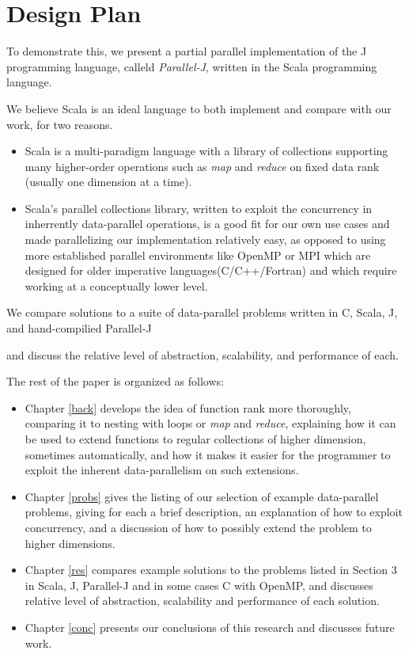 \section{Design Plan}
To demonstrate this, we present a partial parallel implementation of the J programming language, calleld \textit{Parallel-J}, written in the Scala programming language.\begin{comment}TODO cite?\end{comment}
We believe Scala is an ideal language to both implement and compare with our work, for two reasons.
\begin{itemize}
    \item Scala is a multi-paradigm language with a library of collections supporting many higher-order operations such as \textit{map} and \textit{reduce} on fixed data rank (usually one dimension at a time). %
    \item Scala's parallel collections library\cite{pc}, written to exploit the concurrency in inherrently data-parallel operations, is a good fit for our own use cases and made parallelizing our implementation relatively easy, as opposed to using more established parallel environments like OpenMP or MPI which are designed for older imperative languages(C/C++/Fortran) and which require working at a conceptually lower level.
\end{itemize}
We compare solutions to a suite of data-parallel problems written in C, Scala, J, and hand-compilied Parallel-J\begin{comment}TODO really should change name\end{comment} and discuss the relative level of abstraction, scalability, and performance of each.

The rest of the paper is organized as follows:
\begin{itemize}
    \item Chapter \ref{back} develops the idea of function rank more thoroughly, comparing it to nesting with loops or \textit{map} and \textit{reduce}, explaining how it can be used to extend functions to regular collections of higher dimension, sometimes automatically, and how it makes it easier for the programmer to exploit the inherent data-parallelism on such extensions. 
    \item Chapter \ref{probs} gives the listing of our selection of example data-parallel problems, giving for each a brief description, an explanation of how to exploit concurrency, and a discussion of how to possibly extend the problem to higher dimensions.
    \item Chapter \ref{res} compares example solutions to the problems listed in Section 3 in Scala, J, Parallel-J and in some cases C with OpenMP, and discusses relative level of abstraction, scalability and performance of each solution. 
    \item Chapter \ref{conc} presents our conclusions of this research and discusses future work.
\end{itemize}

